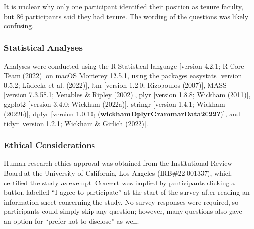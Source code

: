 \documentclass[
  twocolumn]{article}
\begin{document}
It is unclear why only one participant identified their position as
tenure faculty, but 86 participants said they had tenure. The wording of
the questions was likely confusing.

\subsubsection{Statistical Analyses}\label{statistical-analyses}

Analyses were conducted using the R Statistical language {[}version
4.2.1; R Core Team (2022){]} on macOS Monterey 12.5.1, using the
packages easystats {[}version 0.5.2; Lüdecke et al. (2022){]}, ltm
{[}version 1.2.0; Rizopoulos (2007){]}, MASS {[}version 7.3.58.1;
Venables \& Ripley (2002){]}, plyr {[}version 1.8.8; Wickham (2011){]},
ggplot2 {[}version 3.4.0; Wickham (2022a){]}, stringr {[}version 1.4.1;
Wickham (2022b){]}, dplyr {[}version 1.0.10;
(\textbf{wickhamDplyrGrammarData2022?}){]}, and tidyr {[}version 1.2.1;
Wickham \& Girlich (2022){]}.

\subsubsection{Ethical Considerations}\label{ethical-considerations}

Human research ethics approval was obtained from the Institutional
Review Board at the University of California, Los Angeles
(IRB\#22-001337), which certified the study as exempt. Consent was
implied by participants clicking a button labelled ``I agree to
participate'' at the start of the survey after reading an information
sheet concerning the study. No survey responses were required, so
participants could simply skip any question; however, many questions
also gave an option for ``prefer not to disclose'' as well.
\end{document}
